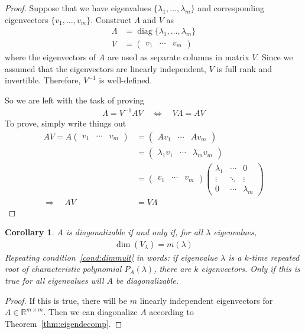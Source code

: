 \documentclass[12pt]{book}
\numberwithin{equation}{section} %
\theoremstyle{plain}
\newtheorem{cor}[thm]{Corollary}
\theoremstyle{definition}
\theoremstyle{remark}
\newcommand{\diag}{\operatorname{diag}}
\newcommand{\Rmm}{\mathbb{R}^{m\times m}}
\begin{document}
\begin{proof}
Suppose that we have eigenvalues $\{\lambda_1,\ldots,\lambda_m\}$ and
corresponding eigenvectors $\{v_1,\ldots,v_m\}$.
Construct $\Lambda$ and $V$ as
\begin{align*}
  \Lambda &= \diag\{\lambda_1, \ldots, \lambda_m\} \\
  V &=
  \begin{pmatrix}
    v_1 & \cdots & v_m
  \end{pmatrix}
\end{align*}
where the eigenvectors of $A$ are used as separate columns in matrix
$V$.  Since we assumed that the eigenvectors are linearly independent,
$V$ is full rank and invertible. Therefore, $V^{-1}$ is well-defined.

So we are left with the task of proving
\begin{align*}
  \Lambda = V^{-1} A V
  \quad\Leftrightarrow\quad
  V\Lambda = A V
\end{align*}
To prove, simply write things out
\begin{align*}
  AV = A
  \begin{pmatrix}
    v_1 & \cdots & v_m
  \end{pmatrix}
  &=
  \begin{pmatrix}
    Av_1 & \cdots & Av_m
  \end{pmatrix} \\
  &=
  \begin{pmatrix}
    \lambda_1 v_1 & \cdots & \lambda_m v_m
  \end{pmatrix} \\
  &=
  \begin{pmatrix}
    v_1 & \cdots & v_m
  \end{pmatrix}
  \begin{pmatrix}
    \lambda_1 & \cdots & 0 \\
    \vdots & \ddots & \vdots \\
    0 & \cdots & \lambda_m
  \end{pmatrix}\\
  \Rightarrow\quad
  AV &= V\Lambda
\end{align*}
\end{proof}

\begin{cor}
$A$ is diagonalizable if and only if, for all $\lambda$ eigenvalues,
\begin{align}
  \label{cond:dimmult}
  \dim(V_\lambda)=m(\lambda)
\end{align}
Repeating condition~\ref{cond:dimmult} in words: if eigenvalue $\lambda$
is a $k$-time repeated root of characteristic polynomial $P_A(\lambda)$,
there are $k$ eigenvectors. Only if this is true for all eigenvalues
will $A$ be diagonalizable.
\end{cor}
\begin{proof}
If this is true, there will be $m$ linearly independent eigenvectors for
$A\in \Rmm$. Then we can diagonalize $A$ according to
Theorem~\ref{thm:eigendecomp}.
\end{proof}
\end{document}
